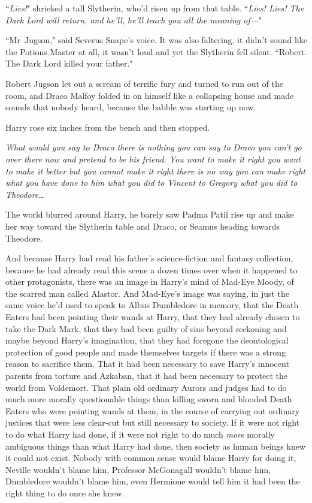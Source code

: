 ``\emph{Lies!}" shrieked a tall Slytherin, who'd risen up from that table. ``\emph{Lies! Lies! The Dark Lord will return, and he'll, he'll teach you all the meaning of—}"

``Mr~Jugson," said Severus Snape's voice. It was also faltering, it didn't sound like the Potions Master at all, it wasn't loud and yet the Slytherin fell silent. ``Robert. The Dark Lord killed your father."

Robert Jugson let out a scream of terrific fury and turned to run out of the room, and Draco Malfoy folded in on himself like a collapsing house and made sounds that nobody heard, because the babble was starting up now.

Harry rose six inches from the bench and then stopped.

\emph{What would you say to Draco there is nothing you can say to Draco you can't go over there now and pretend to be his friend. You want to make it right you want to make it better but you cannot make it right there is no way you can make right what you have done to him what you did to Vincent to Gregory what you did to Theodore{\ldots}}

The world blurred around Harry, he barely saw Padma Patil rise up and make her way toward the Slytherin table and Draco, or Seamus heading towards Theodore.

And because Harry had read his father's science-fiction and fantasy collection, because he had already read this scene a dozen times over when it happened to other protagonists, there was an image in Harry's mind of Mad-Eye Moody, of the scarred man called Alastor. And Mad-Eye's image was saying, in just the same voice he'd used to speak to Albus Dumbledore in memory, that the Death Eaters had been pointing their wands at Harry, that they had already chosen to take the Dark Mark, that they had been guilty of sins beyond reckoning and maybe beyond Harry's imagination, that they had foregone the deontological protection of good people and made themselves targets if there was a strong reason to sacrifice them. That it had been necessary to save Harry's innocent parents from torture and Azkaban, that it had been necessary to protect the world from Voldemort. That plain old ordinary Aurors and judges had to do much more morally questionable things than killing sworn and blooded Death Eaters who were pointing wands at them, in the course of carrying out ordinary justices that were less clear-cut but still necessary to society. If it were not right to do what Harry had done, if it were not right to do much \emph{more} morally ambiguous things than what Harry had done, then society as human beings knew it could not exist. Nobody with common sense would blame Harry for doing it, Neville wouldn't blame him, Professor McGonagall wouldn't blame him, Dumbledore wouldn't blame him, even Hermione would tell him it had been the right thing to do once she knew.

